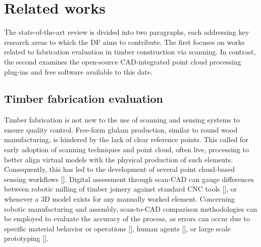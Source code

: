 \section{Related works}
The state-of-the-art review is divided into two paragraphs, each addressing key research areas to which the DF aims to contribute. The first focuses on works related to fabrication evaluation in timber construction via scanning. In contrast, the second examines the open-source CAD-integrated point cloud processing plug-ins and free software available to this date. 

\subsection{Timber fabrication evaluation}
\label{sec:rel:timber_eval}
Timber fabrication is not new to the use of scanning and sensing systems to ensure quality control.
Free-form glulam production, similar to round wood manufacturing, is hindered by the lack of clear reference points. This called for early adoption of scanning techniques and point cloud, often live, processing to better align virtual models with the physical production of such elements. Consequently, this has led to the development of several point cloud-based sensing workflows [\cite{Svilans2019, Svilans2021, Vestartas2020, Larsen2020}].
Digital assessment through scan-CAD can gauge differences between robotic milling of timber joinery against standard CNC tools [\cite{Pantscharowitsch}], or whenever a 3D model exists for any manually worked element.
Concerning robotic manufacturing and assembly, scan-to-CAD comparison methodologies can be employed to evaluate the accuracy of the process, as errors can occur due to specific material behavior or operations [\cite{Ruan2023}], human agents [\cite{Skevaki2024}], or large scale prototyping [\cite{Mesnil2023}].

